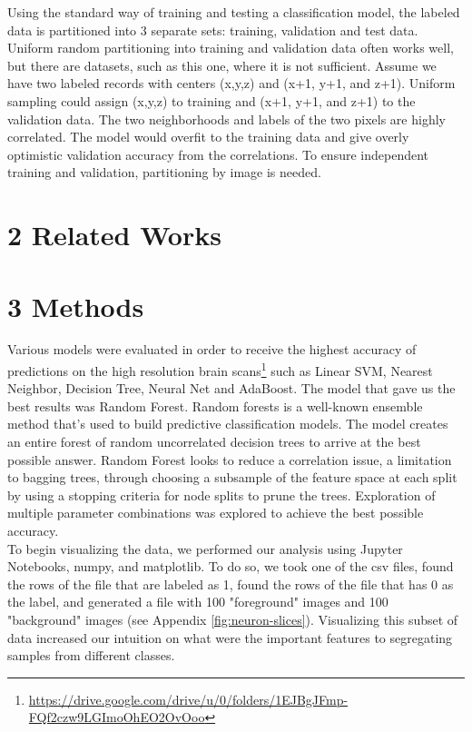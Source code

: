 \documentclass{neu_handout}
\begin{document}
Using the standard way of training and testing a classification model, the labeled data is partitioned into 3 separate sets: training, validation and test data. Uniform random partitioning into training and validation data often works well, but there are datasets, such as this one, where it is not sufficient. Assume we have two labeled records with centers (x,y,z) and (x+1, y+1, and z+1). Uniform sampling could assign (x,y,z) to training and (x+1, y+1, and z+1) to the validation data. The two neighborhoods and labels of the two pixels are highly correlated. The model would overfit to the training data and give overly optimistic validation accuracy from the correlations. To ensure independent training and validation, partitioning by image is needed.\\

\section*{2 Related Works}

\section*{3 Methods}
Various models were evaluated in order to receive the highest accuracy of predictions on the high resolution brain scans\footnote{\url{https://drive.google.com/drive/u/0/folders/1EJBgJFmp-FQf2czw9LGImoOhEO2OvOoo}} such as Linear SVM, Nearest Neighbor, Decision Tree, Neural Net and AdaBoost. The model that gave us the best results was Random Forest. Random forests is a well-known ensemble method that's used to build predictive classification models. The model creates an entire forest of random uncorrelated decision trees to arrive at the best possible answer. Random Forest looks to reduce a correlation issue, a limitation to bagging trees, through choosing a subsample of the feature space at each split by using a stopping criteria for node splits to prune the trees. Exploration of multiple parameter combinations was explored to achieve the best possible accuracy. \\

To begin visualizing the data, we performed our analysis using Jupyter Notebooks, numpy, and matplotlib. To do so, we took one of the csv files, found the rows of the file that are labeled as 1, found the rows of the file that has 0 as the label, and generated a file with 100 "foreground" images and 100 "background" images (see Appendix \ref{fig:neuron-slices}). Visualizing this subset of data increased our intuition on what were the important features to segregating samples from different classes.
\end{document}

